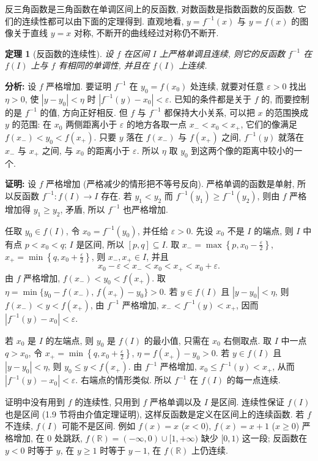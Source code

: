 \documentclass[UTF8,openany]{ctexbook}
\theoremstyle{chinesetextbook}
\newtheorem{theorem}{定理}[section]
\newenvironment{cnproof}{\par\indent\textbf{证明:} \ignorespaces}{\par}
\begin{document}
反三角函数是三角函数在单调区间上的反函数, 对数函数是指数函数的反函数. 它们的连续性都可以由下面的定理得到. 直观地看, $y=f^{-1}(x)$ 与 $y=f(x)$ 的图像关于直线 $y=x$ 对称, 不断开的曲线经过对称仍不断开.
\begin{theorem}[反函数的连续性]
设 $f$ 在区间 $I$ 上严格单调且连续, 则它的反函数 $f^{-1}$ 在 $f(I)$ 上与 $f$ 有相同的单调性, 并且在 $f(I)$ 上连续.
\end{theorem}
\par\indent\textbf{分析:} 设 $f$ 严格增加. 要证明 $f^{-1}$ 在 $y_0=f(x_0)$ 处连续, 就要对任意 $\varepsilon>0$ 找出 $\eta>0$, 使 $|y-y_0|<\eta$ 时 $|f^{-1}(y)-x_0|<\varepsilon$. 已知的条件都是关于 $f$ 的, 而要控制的是 $f^{-1}$ 的值, 方向正好相反. 但 $f$ 与 $f^{-1}$ 都保持大小关系, 可以把 $x$ 的范围换成 $y$ 的范围: 在 $x_0$ 两侧距离小于 $\varepsilon$ 的地方各取一点 $x_-<x_0<x_+$, 它们的像满足 $f(x_-)<y_0<f(x_+)$. 只要 $y$ 落在 $f(x_-)$ 与 $f(x_+)$ 之间, $f^{-1}(y)$ 就落在 $x_-$ 与 $x_+$ 之间, 与 $x_0$ 的距离小于 $\varepsilon$. 所以 $\eta$ 取 $y_0$ 到这两个像的距离中较小的一个.
\begin{cnproof}
设 $f$ 严格增加 (严格减少的情形把不等号反向). 严格单调的函数是单射, 所以反函数 $f^{-1}:f(I)\to I$ 存在. 若 $y_1<y_2$ 而 $f^{-1}(y_1)\ge f^{-1}(y_2)$, 则由 $f$ 严格增加得 $y_1\ge y_2$, 矛盾, 所以 $f^{-1}$ 也严格增加.

任取 $y_0\in f(I)$, 令 $x_0=f^{-1}(y_0)$, 并任给 $\varepsilon>0$. 先设 $x_0$ 不是 $I$ 的端点, 则 $I$ 中有点 $p<x_0<q$; $I$ 是区间, 所以 $[p,q]\subseteq I$. 取 $\displaystyle x_-=\max\left\{p,x_0-\frac\varepsilon2\right\}$, $\displaystyle x_+=\min\left\{q,x_0+\frac\varepsilon2\right\}$, 则 $x_-,x_+\in I$, 并且
\[
x_0-\varepsilon<x_-<x_0<x_+<x_0+\varepsilon.
\]
由 $f$ 严格增加, $f(x_-)<y_0<f(x_+)$. 取 $\eta=\min\{y_0-f(x_-),\,f(x_+)-y_0\}>0$. 若 $y\in f(I)$ 且 $|y-y_0|<\eta$, 则 $f(x_-)<y<f(x_+)$, 由 $f^{-1}$ 严格增加, $x_-<f^{-1}(y)<x_+$, 因而 $|f^{-1}(y)-x_0|<\varepsilon$.

若 $x_0$ 是 $I$ 的左端点, 则 $y_0$ 是 $f(I)$ 的最小值, 只需在 $x_0$ 右侧取点. 取 $I$ 中一点 $q>x_0$, 令 $\displaystyle x_+=\min\left\{q,x_0+\frac\varepsilon2\right\}$, $\eta=f(x_+)-y_0>0$. 若 $y\in f(I)$ 且 $|y-y_0|<\eta$, 则 $y_0\le y<f(x_+)$. 由 $f^{-1}$ 严格增加, $x_0\le f^{-1}(y)<x_+$, 从而 $|f^{-1}(y)-x_0|<\varepsilon$. 右端点的情形类似. 所以 $f^{-1}$ 在 $f(I)$ 的每一点连续.
\end{cnproof}
证明中没有用到 $f$ 的连续性, 只用到 $f$ 严格单调以及 $I$ 是区间. 连续性保证 $f(I)$ 也是区间 (1.9 节将由介值定理证明), 这样反函数是定义在区间上的连续函数. 若 $f$ 不连续, $f(I)$ 可能不是区间. 例如 $f(x)=x$ ($x<0$), $f(x)=x+1$ ($x\ge0$) 严格增加, 在 $0$ 处跳跃, $f(\mathbb R)=(-\infty,0)\cup[1,+\infty)$ 缺少 $[0,1)$ 这一段; 反函数在 $y<0$ 时等于 $y$, 在 $y\ge1$ 时等于 $y-1$, 在 $f(\mathbb R)$ 上仍连续.
\end{document}
